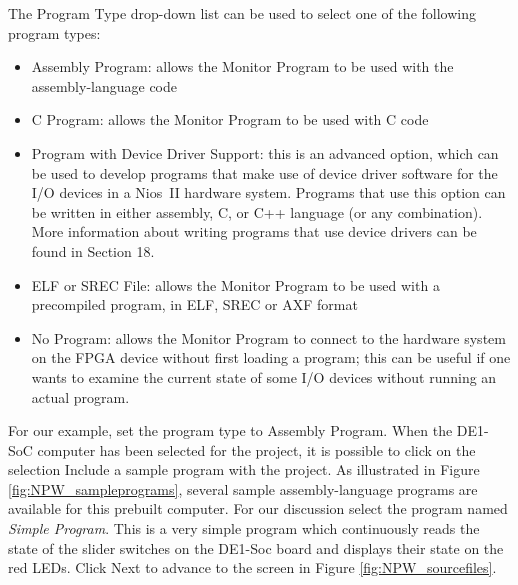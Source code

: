 \documentclass[11pt, twoside, pdftex]{article}
\begin{document}
The {\sf Program Type} drop-down list can be used to select one of the following program types:

\begin{itemize}
\item {\sf Assembly Program}: allows the Monitor Program to be
used with the assembly-language code
\item {\sf C Program}: allows the Monitor Program to be used with
C code
\item {\sf Program with Device Driver Support}: this is an
advanced option, which can be used to develop programs that make
use of device driver software for the I/O devices in a Nios~II
hardware system.  Programs that use this option can be written in
either assembly, C, or C++ language (or any combination). 
More information about writing programs that use device drivers
can be found in Section 18.
\item {\sf ELF or SREC File}: allows the Monitor Program to be
used with a precompiled program, in ELF, SREC or AXF format
\item {\sf No Program}: allows the Monitor Program to connect to
the hardware system on the FPGA device without first loading a
program; this can be useful if one wants to examine the current
state of some I/O devices without running an actual program.
\end{itemize}

For our example, set the program type to {\sf Assembly Program}.
When the DE1-SoC computer has been selected for the project, 
it is possible to click on the
selection {\sf Include a sample program with the project}.  
As illustrated in Figure \ref{fig:NPW_sampleprograms}, several sample 
assembly-language programs are available for this prebuilt
computer.  For our discussion select the program named 
{\it Simple Program}. This is a very simple program which
continuously reads the state of the slider switches on the
DE1-Soc board and displays their state on the red LEDs.
Click {\sf Next} to advance to the screen in Figure \ref{fig:NPW_sourcefiles}.
\end{document}
